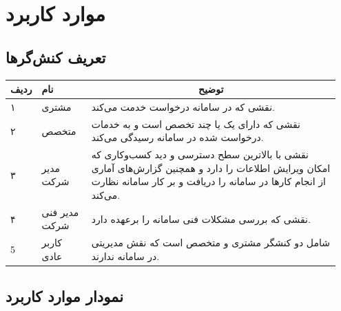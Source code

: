 
\chapter{موارد کاربرد}


\section{تعریف کنش‌گر‌ها}


\begin{table}[h]
	\setlength\extrarowheight{-5pt}
	\centering
	\begin{tabular}{|p{0.05\linewidth}|p{0.15\linewidth}|p{0.75\linewidth}|} 
\hline
\multicolumn{1}{|c|}{\textbf{ردیف}} & \textbf{نام}  & \multicolumn{1}{c|}{\textbf{توضیح}}                                                                                                                                  \\ \hline
۱                                   & مشتری         & نقشی که در سامانه درخواست خدمت می‌کند.                                                                                                                               \\ \hline
۲                                   & متخصص         & نقشی که دارای یک یا چند تخصص است و به خدمات درخواست شده در سامانه رسیدگی می‌کند.                                                                                     \\ \hline
۳                                   & مدیر شرکت     & نقشی با بالاترین سطح دسترسی و دید کسب‌و‌کاری که امکان ویرایش اطلاعات را دارد و همچنین گزارش‌های آماری از انجام کارها در سامانه را دریافت و بر کار سامانه نظارت می‌کند. \\ \hline
۴                                   & مدیر فنی شرکت & نقشی که بررسی مشکلات فنی سامانه را برعهده دارد.  
 \\ \hline
 
 5                                  & کاربر عادی         & شامل دو کنشگر مشتری و متخصص است که نقش مدیریتی در سامانه ندارند.\\ \hline

	\end{tabular}
\end{table}
\newpage
\section{نمودار موارد کاربرد}


